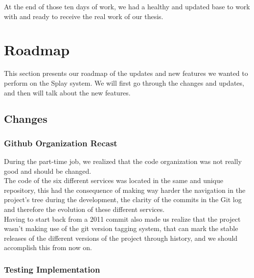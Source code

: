 \documentclass{eplmastersthesis}
\begin{document}
      At the end of those ten days of work, we had a healthy and updated
      base to work with and ready to receive the real work of our thesis.

    \section{Roadmap}

      This section presents our roadmap of the updates and new features
      we wanted to perform on the Splay system. We will first go through
      the changes and updates, and then will talk about the new features.

      \subsection{Changes}


        \subsubsection{Github Organization Recast}

          During the part-time job, we realized that the code organization
          was not really good and should be changed.\\
          The code of the six different services was located in the same and
          unique repository, this had the consequence of making way harder
          the navigation in the project's tree during the development, the
          clarity of the commits in the Git log and therefore the evolution
          of these different services.\\

          Having to start back from a 2011 commit also made us realize that the
          project wasn't making use of the git version tagging system, that
          can mark the stable releases of the different versions of the project
          through history, and we should accomplish this from now on.

        \subsubsection{Testing Implementation}
\end{document}
